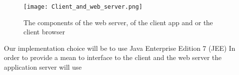 \begin{figure}[H]
\begin{center}
		\hspace*{-0pt}
		\texttt{[image: Client\_and\_web\_server.png]}
\end{center}
\caption{The components of the web server, of the client app and or the client browser}
\end{figure}
Our implementation choice will be to use Java Enterprise Edition 7 (JEE)
In order to provide a mean to interface to the client and the web server the application server will use 